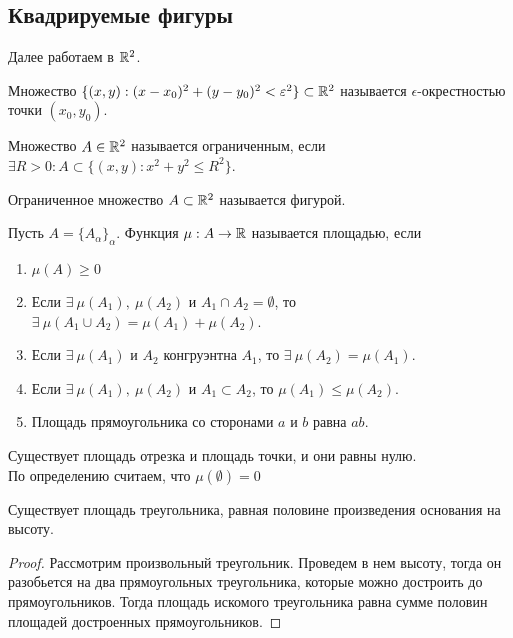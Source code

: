 \subsection{Квадрируемые фигуры}
Далее работаем в $\mathbb{R}^2$.
\begin{definition}
    Множество $\{(x,y): (x-x_0)^2+(y-y_0)^2<\varepsilon^2\}\subset \mathbb{R}^2$ называется $\epsilon$-окрестностью точки $(x_0,y_0)$.
\end{definition}
\begin{definition}
    Множество $A\in \mathbb{R}^2$ называется ограниченным, если $\exists R>0: A\subset \{(x,y): x^2+y^2\leq R^2\}$.
\end{definition}  
\begin{definition}
    Ограниченное множество $A\subset \mathbb{R}^2$ называется фигурой.
\end{definition} 
\begin{definition}
    Пусть $A=\{A_{\alpha}\}_{\alpha}$. Функция $\mu: A\to \mathbb{R}$ называется площадью, если 
    \begin{enumerate}
        \item $\mu(A)\geq 0$
        \item Если $\exists\ \mu(A_1),\ \mu(A_2)$ и $A_1\cap A_2 =\emptyset$, то $\exists\ \mu(A_1 \cup A_2)=\mu(A_1)+\mu(A_2)$.
        \item Если $\exists\ \mu(A_1)$ и $A_2$ конгруэнтна $A_1$, то $\exists\ \mu(A_2)=\mu(A_1)$.
        \item Если $\exists\ \mu(A_1),\ \mu(A_2)$ и $A_1\subset A_2$, то $\mu(A_1)\leq \mu(A_2)$.
        \item Площадь прямоугольника со сторонами $a$ и $b$ равна $ab$.
    \end{enumerate}
\end{definition} 
\begin{comm}
    Существует площадь отрезка и площадь точки, и они равны нулю.\\
    По определению считаем, что $\mu(\emptyset)=0$
\end{comm} 
\begin{statement}
    Существует площадь треугольника, равная половине произведения основания на высоту.
\end{statement} 
\begin{proof}
    Рассмотрим произвольный треугольник. Проведем в нем высоту, тогда он разобьется на два прямоугольных треугольника, которые можно достроить до прямоугольников. Тогда площадь искомого треугольника равна сумме половин площадей достроенных прямоугольников. 
\end{proof} 
